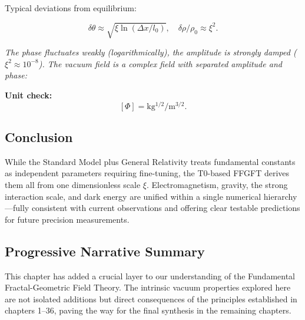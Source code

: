 	Typical deviations from equilibrium:
	
	\begin{equation}
		\delta \theta \approx \sqrt{\xi \ln(\Delta x / l_0)}, \quad \delta \rho / \rho_0 \approx \xi^2.
	\end{equation}
	
	\textit{The phase fluctuates weakly (logarithmically), the amplitude is strongly damped (\(\xi^2 \approx 10^{-8}\)). The vacuum field is a complex field with separated amplitude and phase:}
	
	\textbf{Unit check:}
	\[
	[\Phi] = \si{\kilo\gram^{1/2}\per\meter^{3/2}}.
	\]
	
	\subsection*{Conclusion}
	
	While the Standard Model plus General Relativity treats fundamental constants as independent parameters requiring fine-tuning, the T0-based FFGFT derives them all from one dimensionless scale \(\xi\). Electromagnetism, gravity, the strong interaction scale, and dark energy are unified within a single numerical hierarchy—fully consistent with current observations and offering clear testable predictions for future precision measurements.
	
	\subsection*{Progressive Narrative Summary}
	
	This chapter has added a crucial layer to our understanding of the Fundamental Fractal-Geometric Field Theory. The intrinsic vacuum properties explored here are not isolated additions but direct consequences of the principles established in chapters 1–36, paving the way for the final synthesis in the remaining chapters.


